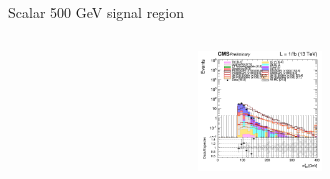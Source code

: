 \documentclass[8pt]{beamer}
\newcommand{\backupend}{
   \setcounter{framenumber}{\value{finalframe}}
}
\begin{document}
\begin{frame}{Scalar 500 GeV signal region}
\begin{columns}
		\begin{column}{0.33\textwidth}
			\begin{center}
     			\includegraphics[width=1.0\textwidth, height=90pt]{figs/2018/log_cratio_topCR_ll_DNN_signal0_scalar500_mt2ll.png}
    		\end{center}		
		\end{column}
\end{columns} \vfill
\end{frame}

\backupend
\end{document}

